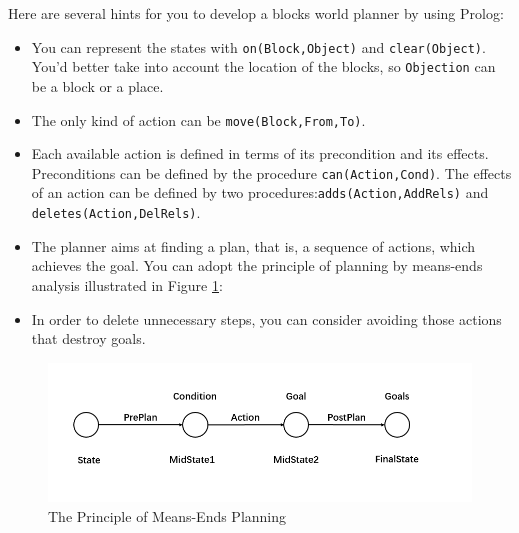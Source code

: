 ﻿\documentclass[a4paper, 11pt]{article}
\begin{document}
Here are several hints for you to develop a blocks world planner by using Prolog:
\begin{itemize}

  \item You can represent the states with \texttt{on(Block,Object)} and \texttt{clear(Object)}. You'd better take into account the location of the blocks, so \texttt{Objection} can be a block or a place.
  \item The only kind of action can be \texttt{move(Block,From,To)}.
  \item Each available action is defined in terms of its precondition and its effects. Preconditions can be defined by the procedure \texttt{can(Action,Cond)}. The effects of an action can be defined by two procedures:\texttt{adds(Action,AddRels)} and \texttt{deletes(Action,DelRels)}.
  \item The planner aims at finding a plan, that is, a sequence of actions, which achieves the goal. You can adopt the principle of planning by means-ends analysis illustrated in Figure \ref{fig:means_ends}:
  \item In order to delete unnecessary steps, you can consider avoiding those actions that destroy goals.

\end{itemize}
\begin{figure}[ht]
    \centering
    \includegraphics[width=17cm]{Pic/means_ends}
    \caption{The Principle of Means-Ends Planning}
    \label{fig:means_ends}
\end{figure}
\end{document}
